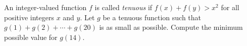 An integer-valued function $f$ is called \emph{tenuous} if $f\left(x\right)+f\left(y\right)>x^2$ for all positive integers $x$ and $y$. Let $g$ be a tenuous function such that $g\left(1\right)+g\left(2\right)+\cdots+g\left(20\right)$ is as small as possible. Compute the minimum possible value for $g\left(14\right)$.